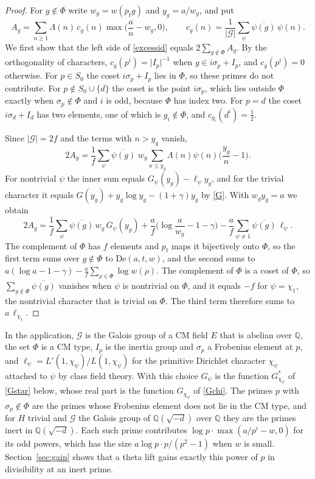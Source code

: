 \begin{proof}
For $g\notin\Phi$ write $w_g=w(p_tg)$ and $y_g=a/w_g$, and put
\[
A_g=\sum_{n\ge1}\Lambda(n)\,c_g(n)\max\Big(\frac an-w_g,0\Big),\qquad c_g(n)=\frac1{\lvert\mathcal G\rvert}\sum_\psi\overline{\psi(g)}\,\psi(n).
\]
We first show that the left side of \eqref{excessid} equals $2\sum_{g\notin\Phi}A_g$. By the orthogonality of characters, $c_g(p^i)=\lvert I_p\rvert^{-1}$ when $g\in i\sigma_p+I_p$, and $c_g(p^i)=0$ otherwise. For $p\in S_0$ the coset $i\sigma_p+I_p$ lies in $\Phi$, so these primes do not contribute. For $p\notin S_0\cup\{d\}$ the coset is the point $i\sigma_p$, which lies outside $\Phi$ exactly when $\sigma_p\notin\Phi$ and $i$ is odd, because $\Phi$ has index two. For $p=d$ the coset $i\sigma_d+I_d$ has two elements, one of which is $g_i\notin\Phi$, and $c_{g_i}(d^i)=\frac12$.

Since $\lvert\mathcal G\rvert=2f$ and the terms with $n>y_g$ vanish,
\[
2A_g=\frac1f\sum_\psi\overline{\psi(g)}\;w_g\sum_{n\le y_g}\Lambda(n)\psi(n)\Big(\frac{y_g}n-1\Big).
\]
For nontrivial $\psi$ the inner sum equals $G_\psi(y_g)-\ell_\psi y_g$, and for the trivial character it equals $G(y_g)+y_g\log y_g-(1+\gamma)y_g$ by \eqref{G}. With $w_gy_g=a$ we obtain
\[
2A_g=\frac1f\sum_\psi\overline{\psi(g)}\,w_g\,G_\psi(y_g)+\frac af\Big(\log\frac a{w_g}-1-\gamma\Big)-\frac af\sum_{\psi\ne1}\overline{\psi(g)}\,\ell_\psi .
\]
The complement of $\Phi$ has $f$ elements and $p_t$ maps it bijectively onto $\Phi$, so the first term sums over $g\notin\Phi$ to $\mathrm{De}(a,t,w)$, and the second sums to $a(\log a-1-\gamma)-\frac af\sum_{\rho\in\Phi}\log w(\rho)$. The complement of $\Phi$ is a coset of $\Phi$, so $\sum_{g\notin\Phi}\overline{\psi(g)}$ vanishes when $\psi$ is nontrivial on $\Phi$, and it equals $-f$ for $\psi=\chi_1$, the nontrivial character that is trivial on $\Phi$. The third term therefore sums to $a\,\ell_{\chi_1}$.
\end{proof}

In the application, $\mathcal G$ is the Galois group of a CM field $E$ that is abelian over $\mathbb Q$, the set $\Phi$ is a CM type, $I_p$ is the inertia group and $\sigma_p$ a Frobenius element at $p$, and $\ell_\psi=L'(1,\chi_\psi)/L(1,\chi_\psi)$ for the primitive Dirichlet character $\chi_\psi$ attached to $\psi$ by class field theory. With this choice $G_\psi$ is the function $G^\ast_{\chi_\psi}$ of \eqref{Gstar} below, whose real part is the function $G_{\chi_\psi}$ of \eqref{Gchi}. The primes $p$ with $\sigma_p\notin\Phi$ are the primes whose Frobenius element does not lie in the CM type, and for $H$ trivial and $\mathcal G$ the Galois group of $\mathbb Q(\sqrt{-d})$ over $\mathbb Q$ they are the primes inert in $\mathbb Q(\sqrt{-d})$. Each such prime contributes $\log p\cdot\max(a/p^i-w,0)$ for its odd powers, which has the size $a\log p\cdot p/(p^2-1)$ when $w$ is small. Section~\ref{sec:gain} shows that a theta lift gains exactly this power of $p$ in divisibility at an inert prime.

